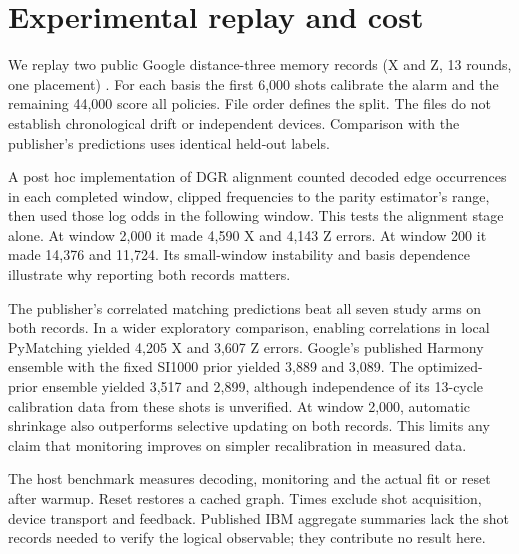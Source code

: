 \documentclass[10pt]{article}
\begin{document}
\section{Experimental replay and cost}
We replay two public Google distance-three memory records (X and Z, 13 rounds, one placement) \cite{google}. For each basis the first 6,000 shots calibrate the alarm and the remaining 44,000 score all policies. File order defines the split. The files do not establish chronological drift or independent devices. Comparison with the publisher's predictions uses identical held-out labels.

A post hoc implementation of DGR alignment counted decoded edge occurrences in each completed window, clipped frequencies to the parity estimator's range, then used those log odds in the following window. This tests the alignment stage alone. At window 2,000 it made 4,590 X and 4,143 Z errors. At window 200 it made 14,376 and 11,724. Its small-window instability and basis dependence illustrate why reporting both records matters.

The publisher's correlated matching predictions beat all seven study arms on both records. In a wider exploratory comparison, enabling correlations in local PyMatching yielded 4,205 X and 3,607 Z errors. Google's published Harmony ensemble with the fixed SI1000 prior yielded 3,889 and 3,089. The optimized-prior ensemble yielded 3,517 and 2,899, although independence of its 13-cycle calibration data from these shots is unverified. At window 2,000, automatic shrinkage also outperforms selective updating on both records. This limits any claim that monitoring improves on simpler recalibration in measured data.


The host benchmark measures decoding, monitoring and the actual fit or reset after warmup. Reset restores a cached graph. Times exclude shot acquisition, device transport and feedback. Published IBM aggregate summaries lack the shot records needed to verify the logical observable; they contribute no result here.
\end{document}
